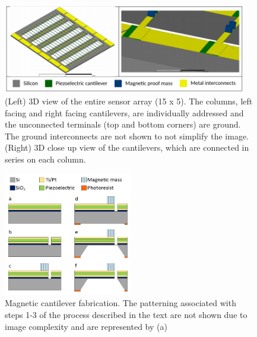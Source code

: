 \begin{figure}
\centering
\includegraphics[width=0.95\textwidth]{yoon_3d}
\caption{(Left) 3D view of the entire sensor array (15 x 5). The columns, left facing and right facing cantilevers, are individually addressed and the unconnected terminals (top and bottom corners) are ground. The ground interconnects are not shown to not simplify the image. (Right) 3D close up view of the cantilevers, which are connected in series on each column.}
\label{fig:yoon_3d}
\end{figure}

\begin{figure}[h!]
\centering
\includegraphics[width=0.5\textwidth]{yoon_process}
\caption{Magnetic cantilever fabrication. The patterning associated with steps 1-3 of the process described in the text are not
shown due to image complexity and are represented by (a)}
\label{fig:yoon_process}
\end{figure}

